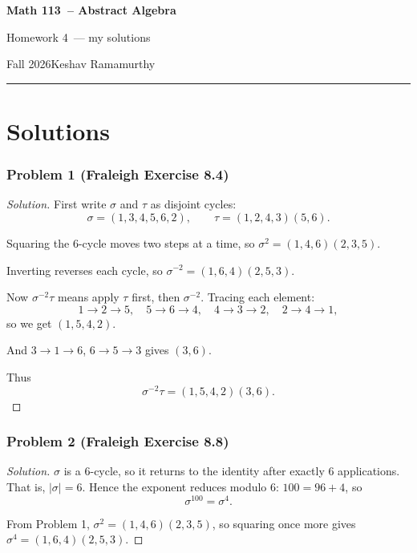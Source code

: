 \documentclass[11pt]{article}
\newcommand{\studentname}{Keshav Ramamurthy}
\newcommand{\coursename}{Math 113}
\newcommand{\courselongname}{Abstract Algebra}
\newcommand{\assignment}{Homework 4}
\newcommand{\term}{Fall 2026}
\newcommand{\1}{\mathbf{1}}
\newcommand{\abs}[1]{\left\lvert#1\right\rvert}
\theoremstyle{definition}
\newenvironment{solution}{\begin{proof}[Solution]}{\end{proof}}
\begin{document}
\begin{center}
  {\Large\sffamily\bfseries \coursename\ -- \courselongname}\par\vspace{3pt}
  {\sffamily \assignment\ — my solutions}\par\vspace{3pt}
  {\small\sffamily \term\quad\textbullet\quad \studentname}
\end{center}
\medskip
\hrule
\bigskip


\clearpage

\section*{Solutions}
\subsubsection*{Problem 1 (Fraleigh Exercise 8.4)}
\begin{solution}
    First write $\sigma$ and $\tau$ as disjoint cycles:
    $$\sigma = (1,3,4,5,6,2), \qquad \tau = (1,2,4,3)(5,6).$$
    \par Squaring the $6$-cycle moves two steps at a time, so $\sigma^2 = (1,4,6)(2,3,5)$.
    \par Inverting reverses each cycle, so $\sigma^{-2} = (1,6,4)(2,5,3)$.
    \par Now $\sigma^{-2}\tau$ means apply $\tau$ first, then $\sigma^{-2}$. Tracing each element:
    $$1 \to 2 \to 5, \quad 5 \to 6 \to 4, \quad 4 \to 3 \to 2, \quad 2 \to 4 \to 1,$$
    so we get $(1,5,4,2)$.
    \par And $3 \to 1 \to 6$, $6 \to 5 \to 3$ gives $(3,6)$.
    \par Thus
    $$\sigma^{-2}\tau = (1,5,4,2)(3,6).$$
\end{solution}
\subsubsection*{Problem 2 (Fraleigh Exercise 8.8)}
\begin{solution}
    $\sigma$ is a $6$-cycle, so it returns to the identity after exactly $6$ applications.
    That is, $\abs{\sigma} = 6$. Hence the exponent reduces modulo $6$: $100 = 96 + 4$, so
    $$\sigma^{100} = \sigma^4.$$
    \par From Problem 1, $\sigma^2 = (1,4,6)(2,3,5)$, so squaring once more gives
    $\sigma^4 = (1,6,4)(2,5,3)$.
\end{solution}
\end{document}
